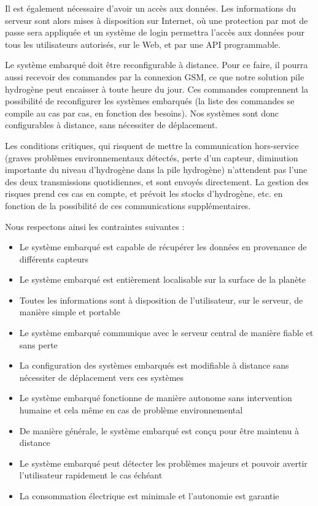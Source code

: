 Il est également nécessaire d’avoir un accès aux données. Les informations du serveur sont alors mises à disposition sur Internet, où une protection par mot de passe sera appliquée et un système de login permettra l’accès aux données pour tous les utilisateurs autorisés, sur le Web, et par une API programmable.

Le système embarqué doit être reconfigurable à distance. Pour ce faire, il pourra aussi recevoir des commandes par la connexion GSM, ce que notre solution pile hydrogène peut encaisser à toute heure du jour. Ces commandes comprennent la possibilité de reconfigurer les systèmes embarqués (la liste des commandes se compile au cas par cas, en fonction des besoins). Nos systèmes sont donc configurables à distance, sans nécessiter de déplacement.

Les conditions critiques, qui risquent de mettre la communication hors-service (graves problèmes environnementaux détectés, perte d’un capteur, diminution importante du niveau d’hydrogène dans la pile hydrogène) n’attendent pas l’une des deux transmissions quotidiennes, et sont envoyés directement. La gestion des risques prend ces cas en compte, et prévoit les stocks d’hydrogène, etc. en fonction de la possibilité de ces communications supplémentaires.

Nous respectons ainsi les contraintes suivantes :

\begin{itemize}
\item Le système embarqué est capable de récupérer les données en provenance de différents capteurs
\item Le système embarqué est entièrement localisable sur la surface de la planète
\item Toutes les informations sont à disposition de l’utilisateur, sur le serveur, de manière simple et portable
\item Le système embarqué communique avec le serveur central de manière fiable et sans perte
\item La configuration des systèmes embarqués est modifiable à distance sans nécessiter de déplacement vers ces systèmes
\item Le système embarqué fonctionne de manière autonome sans intervention humaine et cela même en cas de problème environnemental
\item De manière générale, le système embarqué est conçu pour être maintenu à distance
\item Le système embarqué peut détecter les problèmes majeurs et pouvoir avertir l’utilisateur rapidement le cas échéant
\item La consommation électrique est minimale et l’autonomie est garantie
\end{itemize}

